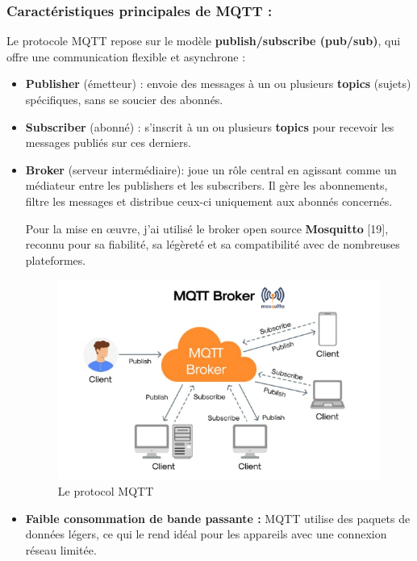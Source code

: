\subsubsection{Caractéristiques principales de MQTT :}  
Le protocole MQTT repose sur le modèle \textbf{publish/subscribe (pub/sub)}, qui offre une communication flexible et asynchrone :  
\begin{itemize}  
	\item  \textbf{Publisher}  (émetteur) : envoie des messages à un ou plusieurs \textbf{topics} (sujets) spécifiques, sans se soucier des abonnés.  
	\item \textbf{Subscriber} (abonné) : s'inscrit à un ou plusieurs \textbf{topics} pour recevoir les messages publiés sur ces derniers.  
	\item \textbf{Broker} (serveur intermédiaire): joue un rôle central en agissant comme un médiateur entre les publishers et les subscribers. Il gère les abonnements, filtre les messages et distribue ceux-ci uniquement aux abonnés concernés.  


Pour la mise en œuvre, j’ai utilisé le broker open source \textbf{Mosquitto} [19], reconnu pour sa fiabilité, sa légèreté et sa compatibilité avec de nombreuses plateformes.  

\begin{figure}[H]
	\centering
	\includegraphics[width=14cm]{./img/broker.png}
	\caption{Le protocol MQTT}

\end{figure}


 	\item \textbf{Faible consommation de bande passante :}
MQTT utilise des paquets de données légers, ce qui le rend idéal pour les appareils avec une connexion réseau limitée.
\end{itemize}  
